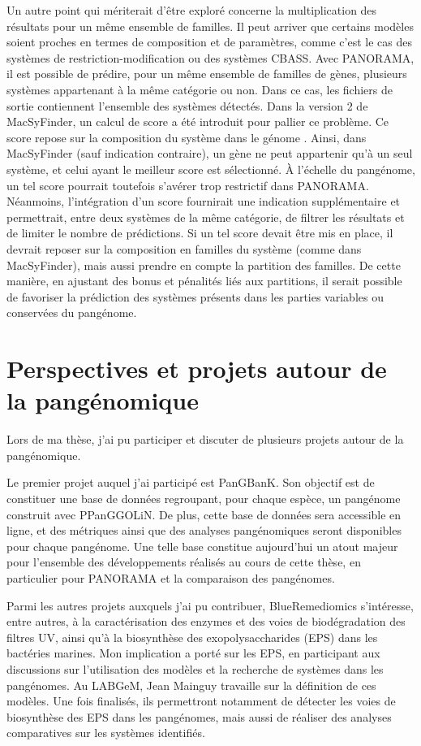 Un autre point qui mériterait d’être exploré concerne la multiplication des résultats pour un même ensemble de familles. Il peut arriver que certains modèles soient proches en termes de composition et de paramètres, comme c’est le cas des systèmes de restriction-modification ou des systèmes CBASS. Avec PANORAMA, il est possible de prédire, pour un même ensemble de familles de gènes, plusieurs systèmes appartenant à la même catégorie ou non. Dans ce cas, les fichiers de sortie contiennent l’ensemble des systèmes détectés.
Dans la version 2 de MacSyFinder, un calcul de score a été introduit pour pallier ce problème. Ce score repose sur la composition du système dans le génome \cite{neron_macsyfinder_2023}. Ainsi, dans MacSyFinder (sauf indication contraire), un gène ne peut appartenir qu’à un seul système, et celui ayant le meilleur score est sélectionné.
À l’échelle du pangénome, un tel score pourrait toutefois s’avérer trop restrictif dans PANORAMA. Néanmoins, l’intégration d’un score fournirait une indication supplémentaire et permettrait, entre deux systèmes de la même catégorie, de filtrer les résultats et de limiter le nombre de prédictions.
Si un tel score devait être mis en place, il devrait reposer sur la composition en familles du système (comme dans MacSyFinder), mais aussi prendre en compte la partition des familles. De cette manière, en ajustant des bonus et pénalités liés aux partitions, il serait possible de favoriser la prédiction des systèmes présents dans les parties variables ou conservées du pangénome.

\section{Perspectives et projets autour de la pangénomique}

Lors de ma thèse, j'ai pu participer et discuter de plusieurs projets autour de la pangénomique.

Le premier projet auquel j’ai participé est PanGBanK. Son objectif est de constituer une base de données regroupant, pour chaque espèce, un pangénome construit avec PPanGGOLiN. De plus, cette base de données sera accessible en ligne, et des métriques ainsi que des analyses pangénomiques seront disponibles pour chaque pangénome.
Une telle base constitue aujourd’hui un atout majeur pour l’ensemble des développements réalisés au cours de cette thèse, en particulier pour PANORAMA et la comparaison des pangénomes.

Parmi les autres projets auxquels j’ai pu contribuer, BlueRemediomics s’intéresse, entre autres, à la caractérisation des enzymes et des voies de biodégradation des filtres UV, ainsi qu’à la biosynthèse des exopolysaccharides (EPS) dans les bactéries marines. Mon implication a porté sur les EPS, en participant aux discussions sur l’utilisation des modèles et la recherche de systèmes dans les pangénomes.
Au LABGeM, Jean Mainguy travaille sur la définition de ces modèles. Une fois finalisés, ils permettront notamment de détecter les voies de biosynthèse des EPS dans les pangénomes, mais aussi de réaliser des analyses comparatives sur les systèmes identifiés.

